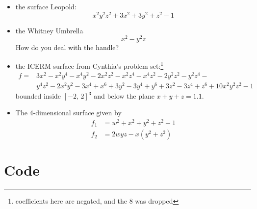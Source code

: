 \documentclass[letter,portrait]{article}
\newcommand{\1}{{\tt \_1}}
\newcommand{\2}{{\tt \_2}}
\begin{document}
\begin{itemize}
\item 
the surface Leopold:
\[
x^2y^2z^2+3x^2+3y^2+z^2-1 
\] 
\item the Whitney Umbrella
\[
x^2 - y^2z
\]
How do you deal with the handle?
\item 
the ICERM surface from Cynthia's problem set:\footnote{coefficients here are negated, and the 8 was dropped}
\begin{align*}
f = &3x^2 - x^2y^4 - x^4y^2 - 2x^2z^2 - x^2z^4 - x^4z^2 - 2y^2z^2 - y^2z^4 - \\
&y^4z^2 - 2x^2y^2 - 3x^4 + x^6 + 3y^2 - 3y^4 + y^6 + 3z^2 - 3z^4 + z^6 + 10x^2y^2z^2 - 1
\end{align*}
bounded inside $[-2,\,2]^3$ and below the plane $x+y+z=1.1$.

\item The 4-dimensional surface given by
\begin{align*}
f_1 &= w^2 + x^2 + y^2 + z^2 - 1 \\
f_2 &= 2wyz - x(y^2 + z^2)
\end{align*}

\end{itemize}
























                                                                        

\appendix
\clearpage
\section{Code}
\end{document}
